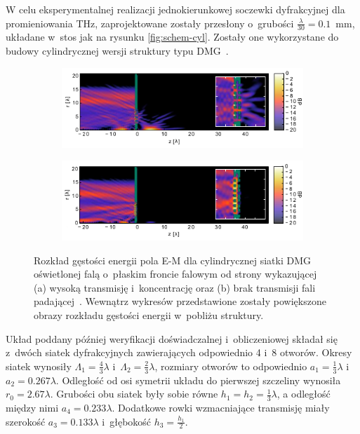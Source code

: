 W celu eksperymentalnej realizacji jednokierunkowej soczewki dyfrakcyjnej dla promieniowania THz, zaprojektowane zostały przesłony o~grubości $\frac{\lambda}{30}=0.1$~mm, układane w~stos jak na rysunku \ref{fig:schem-cyl}. Zostały one wykorzystane do budowy cylindrycznej wersji struktury typu DMG~\cite{Yavorskiy:14}. 
\begin{figure}[htb]
	\begin{subfigure}{\textwidth}
		\includegraphics[width=\textwidth]{images/dmg/express-high-kontrast-trans.png}
		\caption{}
	\end{subfigure}

	\begin{subfigure}{\textwidth}
		\includegraphics[width=\textwidth]{images/dmg/express-high-kontrast-block.png}
		\caption{}
	\end{subfigure}
	\caption{Rozkład gęstości energii pola E-M dla cylindrycznej siatki DMG oświetlonej falą o~płaskim froncie falowym od strony wykazującej (a) wysoką transmisję i~koncentrację oraz (b) brak transmisji fali padającej~\cite{Yavorskiy:14}. Wewnątrz wykresów przedstawione zostały powiększone obrazy rozkładu gęstości energii w~pobliżu struktury.}
	\label{fig:cyl-gest-ene}
\end{figure}

Układ poddany później weryfikacji doświadczalnej i~obliczeniowej składał się z~dwóch siatek dyfrakcyjnych zawierających odpowiednio 4 i~8 otworów. Okresy siatek wynosiły $\Lambda_1=\frac{4}{3} \lambda$ i~$\Lambda_2=\frac{2}{3} \lambda$, rozmiary otworów to odpowiednio $a_1=\frac{1}{3}\lambda$ i~$a_2=0.267 \lambda$. Odległość od osi symetrii układu do pierwszej szczeliny wynosiła $r_0=2.67\lambda$. Grubości obu siatek były sobie równe $h_1=h_2=\frac{1}{3}\lambda$, a odległość między nimi $a_4=0.233\lambda$. Dodatkowe rowki wzmacniające transmisję miały szerokość $a_3=0.133\lambda$ i~głębokość $h_3=\frac{h_1}{2}$. 

